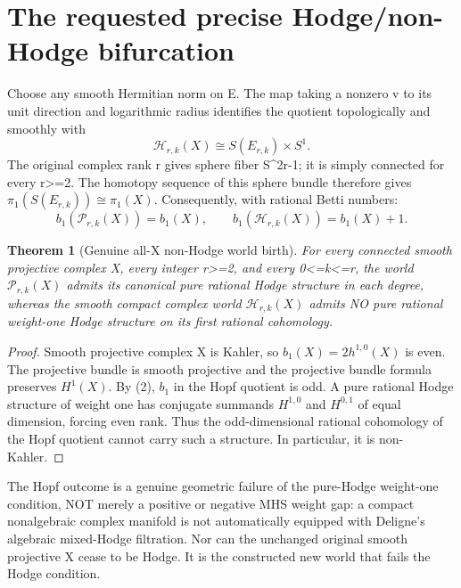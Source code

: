 \documentclass[11pt]{article}
\newtheorem{theorem}{Theorem}
\begin{document}
\section{The requested precise Hodge/non-Hodge bifurcation}
Choose any smooth Hermitian norm on E. The map taking a nonzero v to
its unit direction and logarithmic radius identifies the quotient
topologically and smoothly with
\[
 \boxed{\mathcal H_{r,k}(X)\cong S(E_{r,k})\times S^1.}\tag{2}
\]
The original complex rank r gives sphere fiber S^{2r-1};
it is simply connected for every r>=2. The homotopy sequence of this
sphere bundle therefore gives
$\pi_1(S(E_{r,k}))\cong\pi_1(X)$.
Consequently, with rational Betti numbers:
\[
 \boxed{b_1(\mathcal P_{r,k}(X))=b_1(X),\qquad
 b_1(\mathcal H_{r,k}(X))=b_1(X)+1.}\tag{3}
\]

\begin{theorem}[Genuine all-X non-Hodge world birth]
For every connected smooth projective complex X, every integer r>=2,
and every 0<=k<=r, the world $\mathcal P_{r,k}(X)$ admits its canonical
pure rational Hodge structure in each degree, whereas the smooth
compact complex world $\mathcal H_{r,k}(X)$ admits NO pure rational
weight-one Hodge structure on its first rational cohomology.
\end{theorem}
\begin{proof}
Smooth projective complex X is Kahler, so $b_1(X)=2h^{1,0}(X)$ is even.
The projective bundle is smooth projective and the projective bundle
formula preserves $H^1(X)$.
By (2), $b_1$ in the Hopf quotient is odd. A pure rational Hodge
structure of weight one has conjugate summands $H^{1,0}$ and $H^{0,1}$
of equal dimension, forcing even rank. Thus the odd-dimensional
rational cohomology of the Hopf quotient cannot carry such a structure.
In particular, it is non-Kahler.
\end{proof}
The Hopf outcome is a genuine geometric failure of the pure-Hodge
weight-one condition, NOT merely a positive or negative MHS weight gap:
a compact nonalgebraic complex manifold is not automatically equipped
with Deligne's algebraic mixed-Hodge filtration. Nor can the unchanged
original smooth projective X cease to be Hodge. It is the constructed
new world that fails the Hodge condition.
\end{document}
